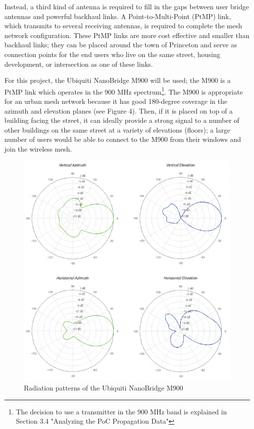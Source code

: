\documentclass[pageno]{jpaper}
\begin{document}
Instead, a third kind of antenna is required to fill in the gaps between user bridge antennas and powerful backhaul links. A Point-to-Multi-Point (PtMP) link, which transmits to several receiving antennas, is required to complete the mesh network configuration. These PtMP links are more cost effective and smaller than backhaul links; they can be placed around the town of Princeton and serve as connection points for the end users who live on the same street, housing development, or intersection as one of these links.

For this project, the Ubiquiti NanoBridge M900 will be used; the M900 is a PtMP link which operates in the 900 MHz spectrum\footnote{The decision to use a transmitter in the 900 MHz band is explained in Section 3.4 "Analyzing the PoC Propagation Data"}. The M900 is appropriate for an urban mesh network because it has good 180-degree coverage in the azimuth and elevation planes (see Figure 4). Then, if it is placed on top of a building facing the street, it can ideally provide a strong signal to a number of other buildings on the same street at a variety of elevations (floors); a large number of users would be able to connect to the M900 from their windows and join the wireless mesh.

\begin{figure}[h]
	\caption{Radiation patterns of the Ubiquiti NanoBridge M900}
	\includegraphics{m900_radiation}
	\centering
\end{figure}
\end{document}
